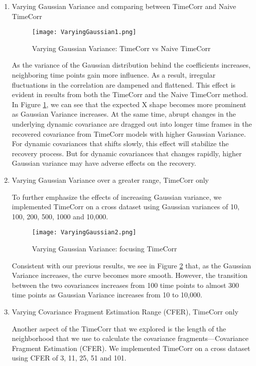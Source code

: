 \documentclass[12pt]{article}
\begin{document}
\begin{enumerate}
\item Varying Gaussian Variance and comparing between TimeCorr and Naive TimeCorr\par
\begin{figure}[h]
\caption{Varying Gaussian Variance: TimeCorr vs Naive TimeCorr}
\centering
\texttt{[image: VaryingGaussian1.png]}
\label{fig:GaussianVariance}
\end{figure}
As the variance of the Gaussian distribution behind the coefficients increases, neighboring time points gain more influence. As a result, irregular fluctuations in the correlation are dampened and flattened. This effect is evident in results from both the TimeCorr and the Naive TimeCorr method. In Figure \ref{fig:GaussianVariance}, we can see that the expected X shape becomes more prominent as Gaussian Variance increases. At the same time, abrupt changes in the underlying dynamic covariance are dragged out into longer time frames in the recovered covariance from TimeCorr models with higher Gaussian Variance. For dynamic covariances that shifts slowly, this effect will stabilize the recovery process. But for dynamic covariances that changes rapidly, higher Gaussian variance may have adverse effects on the recovery.\par
\item Varying Gaussian Variance over a greater range, TimeCorr only\par
To further emphasize the effects of increasing Gaussian variance, we implemented TimeCorr on a cross dataset using Gaussian variances of 10, 100, 200, 500, 1000 and 10,000.\par
\begin{figure}[h]
\caption{Varying Gaussian Variance: focusing TimeCorr}
\centering
\texttt{[image: VaryingGaussian2.png]}
\label{fig:VaryingGaussian2}
\end{figure}
Consistent with our previous results, we see in Figure \ref{fig:VaryingGaussian2} that, as the Gaussian Variance increases, the curve becomes more smooth. However, the transition between the two covariances increases from 100 time points to almost 300 time points as Gaussian Variance increases from 10 to 10,000.\par
\item Varying Covariance Fragment Estimation Range (CFER), TimeCorr only\par
Another aspect of the TimeCorr that we explored is the length of the neighborhood that we use to calculate the covariance fragments---Covariance Fragment Estimation (CFER). We implemented TimeCorr on a cross dataset using CFER of 3, 11, 25, 51 and 101.\par

\end{enumerate}
\end{document}
